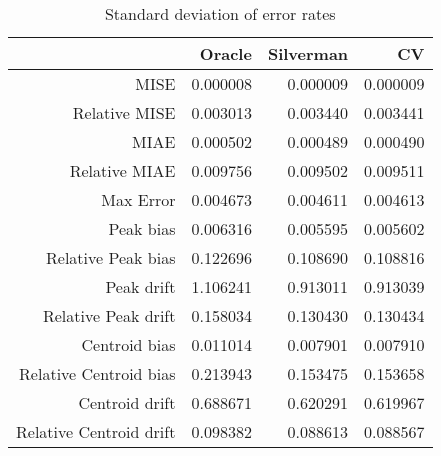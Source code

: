 \begin{table}[ht]
\centering
\begin{tabular}{rrrr}
  \hline
 & Oracle & Silverman & CV \\ 
  \hline
MISE & 0.000008 & 0.000009 & 0.000009 \\ 
  Relative MISE & 0.003013 & 0.003440 & 0.003441 \\ 
  MIAE & 0.000502 & 0.000489 & 0.000490 \\ 
  Relative MIAE & 0.009756 & 0.009502 & 0.009511 \\ 
  Max Error & 0.004673 & 0.004611 & 0.004613 \\ 
  Peak bias & 0.006316 & 0.005595 & 0.005602 \\ 
  Relative Peak bias & 0.122696 & 0.108690 & 0.108816 \\ 
  Peak drift & 1.106241 & 0.913011 & 0.913039 \\ 
  Relative Peak drift & 0.158034 & 0.130430 & 0.130434 \\ 
  Centroid bias & 0.011014 & 0.007901 & 0.007910 \\ 
  Relative Centroid bias & 0.213943 & 0.153475 & 0.153658 \\ 
  Centroid drift & 0.688671 & 0.620291 & 0.619967 \\ 
  Relative Centroid drift & 0.098382 & 0.088613 & 0.088567 \\ 
   \hline
\end{tabular}
\caption{Standard deviation of error rates} 
\label{tbl:stddev_error_rates}
\end{table}
